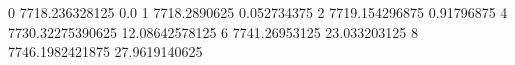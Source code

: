 0 7718.236328125 0.0
1 7718.2890625 0.052734375
2 7719.154296875 0.91796875
4 7730.32275390625 12.08642578125
6 7741.26953125 23.033203125
8 7746.1982421875 27.9619140625
